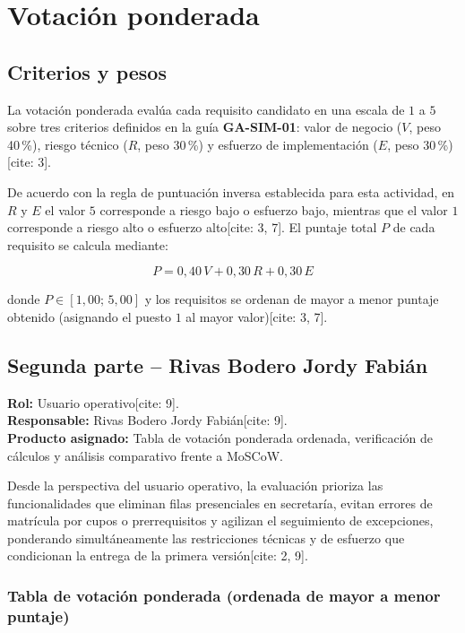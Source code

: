 \documentclass[12pt,a4paper]{article}
\begin{document}
\section{Votación ponderada}

\subsection{Criterios y pesos}

La votación ponderada evalúa cada requisito candidato en una escala de $1$ a $5$ sobre tres criterios definidos en la guía \textbf{GA-SIM-01}: valor de negocio ($V$, peso 40\,\%), riesgo técnico ($R$, peso 30\,\%) y esfuerzo de implementación ($E$, peso 30\,\%)[cite: 3].

De acuerdo con la regla de puntuación inversa establecida para esta actividad, en $R$ y $E$ el valor $5$ corresponde a riesgo bajo o esfuerzo bajo, mientras que el valor $1$ corresponde a riesgo alto o esfuerzo alto[cite: 3, 7]. El puntaje total $P$ de cada requisito se calcula mediante:

\[
P = 0{,}40\,V + 0{,}30\,R + 0{,}30\,E
\]

donde $P \in [1{,}00;\,5{,}00]$ y los requisitos se ordenan de mayor a menor puntaje obtenido (asignando el puesto $1$ al mayor valor)[cite: 3, 7].

\subsection{Segunda parte -- Rivas Bodero Jordy Fabián}

\textbf{Rol:} Usuario operativo[cite: 9].\\
\textbf{Responsable:} Rivas Bodero Jordy Fabián[cite: 9].\\
\textbf{Producto asignado:} Tabla de votación ponderada ordenada, verificación de cálculos y análisis comparativo frente a MoSCoW.

Desde la perspectiva del usuario operativo, la evaluación prioriza las funcionalidades que eliminan filas presenciales en secretaría, evitan errores de matrícula por cupos o prerrequisitos y agilizan el seguimiento de excepciones, ponderando simultáneamente las restricciones técnicas y de esfuerzo que condicionan la entrega de la primera versión[cite: 2, 9].

\subsubsection{Tabla de votación ponderada (ordenada de mayor a menor puntaje)}
\end{document}

